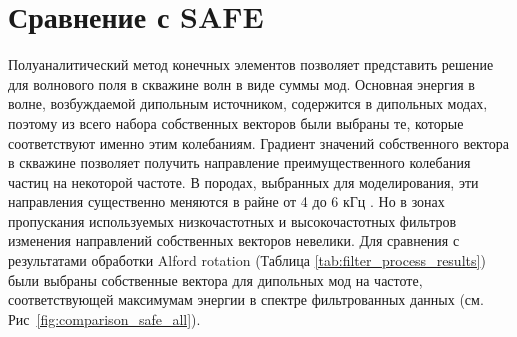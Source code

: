 \documentclass[a4paper,11pt]{article}
\begin{document}
\section{Сравнение с SAFE}
\label{safe_comparison}

Полуаналитический метод конечных элементов позволяет представить решение для волнового поля в скважине волн в виде суммы мод. Основная энергия в волне, возбуждаемой дипольным источником, содержится в дипольных модах, поэтому из всего набора собственных векторов были выбраны те, которые соответствуют именно этим колебаниям. Градиент значений собственного вектора в скважине позволяет получить направление преимущественного колебания частиц на некоторой частоте. В породах, выбранных для моделирования, эти направления существенно меняются в райне от 4 до 6 кГц \cite{Zharnikov2015}. Но в зонах пропускания используемых низкочастотных и высокочастотных фильтров изменения направлений собственных векторов невелики. Для сравнения с результатами обработки Alford rotation (Таблица \ref{tab:filter_process_results}) были выбраны собственные вектора для дипольных мод на частоте, соответствующей максимумам энергии в спектре фильтрованных данных (см. Рис~\ref{fig:comparison_safe_all}).

\end{document}
